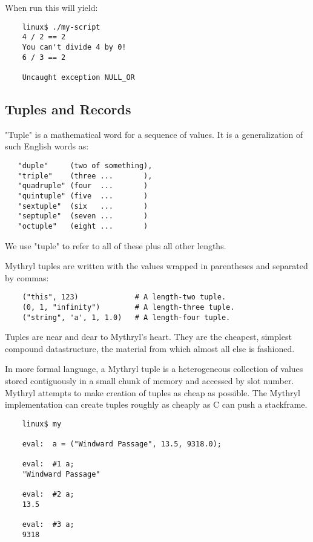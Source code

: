 When run this will yield:

\begin{verbatim}
    linux$ ./my-script
    4 / 2 == 2
    You can't divide 4 by 0!
    6 / 3 == 2

    Uncaught exception NULL_OR
\end{verbatim}


\cutend*

\subsection{Tuples and Records}

"Tuple" is a mathematical word for a sequence of values.  It is a 
generalization of such English words as:

\begin{verbatim}
   "duple"     (two of something),
   "triple"    (three ...       ),
   "quadruple" (four  ...       )
   "quintuple" (five  ...       )
   "sextuple"  (six   ...       )
   "septuple"  (seven ...       )
   "octuple"   (eight ...       )
\end{verbatim}

We use "tuple" to refer to all of these plus all other lengths.

Mythryl tuples are written with the values wrapped in parentheses 
and separated by commas:

\begin{verbatim}
    ("this", 123)             # A length-two tuple.
    (0, 1, "infinity")        # A length-three tuple.
    ("string", 'a', 1, 1.0)   # A length-four tuple.
\end{verbatim}

Tuples are near and dear to Mythryl's heart.  They are the cheapest, 
simplest compound datastructure, the material from which almost all 
else is fashioned.

In more formal language, a Mythryl tuple is a heterogeneous collection 
of values stored contiguously in a small chunk of memory and accessed 
by slot number.  Mythryl attempts to make creation of tuples as cheap 
as possible.  The Mythryl implementation can create tuples roughly as 
cheaply as C can push a stackframe.

\begin{verbatim}
    linux$ my

    eval:  a = ("Windward Passage", 13.5, 9318.0);

    eval:  #1 a;
    "Windward Passage"

    eval:  #2 a;
    13.5

    eval:  #3 a;
    9318
\end{verbatim}

